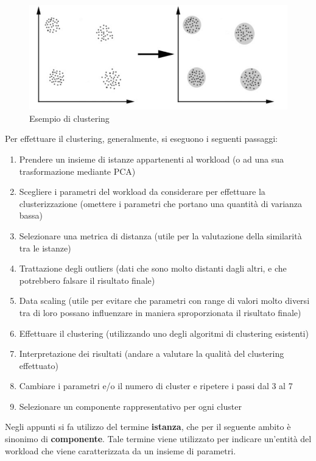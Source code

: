 \begin{figure}[h]
\centering
\includegraphics[width=.6\textwidth]{img/clustering.png}
\caption{Esempio di clustering}\label{img:clustering}
\end{figure}

Per effettuare il clustering, generalmente, si eseguono i seguenti passaggi:
\begin{enumerate}
    \item Prendere un insieme di istanze appartenenti al workload (o ad una sua trasformazione mediante PCA)
    \item Scegliere i parametri del workload da considerare per effettuare la clusterizzazione (omettere i parametri che portano una quantità di varianza bassa)
    \item Selezionare una metrica di distanza (utile per la valutazione della similarità tra le istanze)
    \item Trattazione degli outliers (dati che sono molto distanti dagli altri, e che potrebbero falsare il risultato finale)
    \item Data scaling (utile per evitare che parametri con range di valori molto diversi tra di loro possano influenzare in maniera sproporzionata il risultato finale)
    \item Effettuare il clustering (utilizzando uno degli algoritmi di clustering esistenti)
    \item Interpretazione dei risultati (andare a valutare la qualità del clustering effettuato)
    \item Cambiare i parametri e/o il numero di cluster e ripetere i passi dal 3 al 7
    \item Selezionare un componente rappresentativo per ogni cluster
\end{enumerate}

\begin{warn}
Negli appunti si fa utilizzo del termine \textbf{istanza}, che per il seguente ambito è sinonimo di \textbf{componente}. Tale termine viene utilizzato per indicare un'entità del workload che viene caratterizzata da un insieme di parametri.
\end{warn}

